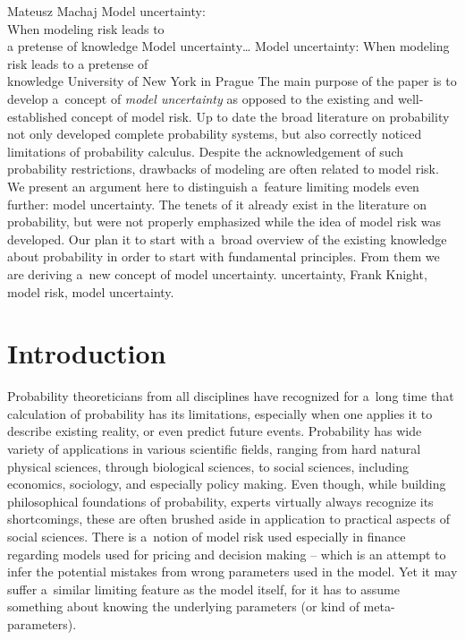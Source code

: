 \begin{artengenv}{Mateusz Machaj}
	{Model uncertainty:\\When modeling risk leads to\\a pretense of knowledge}
	{Model uncertainty\ldots}
	{Model uncertainty: When modeling risk leads to a pretense of\\knowledge}
	{University of New York in Prague\label{machaj-firstpage}}
	{The main purpose of the paper is to develop a~concept of \textit{model uncertainty} as opposed to the existing and well-established concept of model risk. Up to date the broad literature on probability not only developed complete probability systems, but also correctly noticed limitations of probability calculus. Despite the acknowledgement of such probability restrictions, drawbacks of modeling are often related to model risk. We present an argument here to distinguish a~feature limiting models even further: model uncertainty. The tenets of it already exist in the literature on probability, but were not properly emphasized while the idea of model risk was developed. Our plan it to start with a~broad overview of the existing knowledge about probability in order to start with fundamental principles. From them we are deriving a~new concept of model uncertainty.
	}
	{uncertainty, Frank Knight, model risk, model uncertainty.}





\section{Introduction}

\lettrine[loversize=0.13,lines=2,lraise=-0.03,nindent=0em,findent=0.2pt]%
{P}{}robability theoreticians from all disciplines have recognized for a~long time that calculation of probability has its limitations, especially when one applies it to describe existing reality, or even predict future events. Probability has wide variety of applications in various scientific fields, ranging from hard natural physical sciences, through biological sciences, to social sciences, including economics, sociology, and especially policy making. Even though, while building philosophical foundations of probability, experts virtually always recognize its shortcomings, these are often brushed aside in application to practical aspects of social sciences. There is a~notion of model risk used especially in finance regarding models used for pricing and decision making -- which is an attempt to infer the potential mistakes from wrong parameters used in the model. Yet it may suffer a~similar limiting feature as the model itself, for it has to assume something about knowing the underlying parameters (or kind of meta-parameters).




\end{artengenv}
